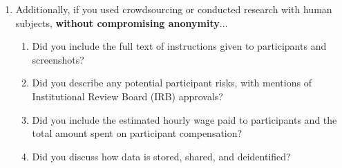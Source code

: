 \documentclass[letterpaper]{article} %
\begin{document}
\begin{enumerate}
\begin{enumerate}

  \item Did you mention the license of the assets?
    

  \item Did you include any new assets in the supplemental material or as a URL?
    

  \item Did you discuss whether and how consent was obtained from people whose data you're using/curating?
    

  \item Did you discuss whether the data you are using/curating contains personally identifiable information or offensive content?
    

  \item If you are curating or releasing new datasets, did you discuss how you intend to make your datasets FAIR (see \citet{fair})?
    

  \item If you are curating or releasing new datasets, did you create a Datasheet for the Dataset (see \citet{gebru2021datasheets})?
    
\end{enumerate}

\item Additionally, if you used crowdsourcing or conducted research with human subjects, \textbf{without compromising anonymity}...
\begin{enumerate}
  \item Did you include the full text of instructions given to participants and screenshots?
    

  \item Did you describe any potential participant risks, with mentions of Institutional Review Board (IRB) approvals?
    

  \item Did you include the estimated hourly wage paid to participants and the total amount spent on participant compensation?
    

  \item Did you discuss how data is stored, shared, and deidentified?
    
\end{enumerate}

\end{enumerate}
\end{document}

